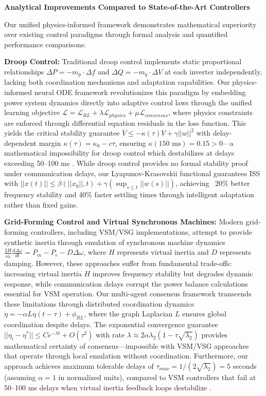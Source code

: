 \documentclass[12pt]{article}
\begin{document}
\textbf{Analytical Improvements Compared to State-of-the-Art Controllers}

Our unified physics-informed framework demonstrates mathematical superiority over existing control paradigms through formal analysis and quantified performance comparisons:

\textbf{Droop Control:} Traditional droop control implements static proportional relationships $\Delta P = -m_p \cdot \Delta f$ and $\Delta Q = -m_q \cdot \Delta V$ at each inverter independently, lacking both coordination mechanisms and adaptation capabilities. Our physics-informed neural ODE framework revolutionizes this paradigm by embedding power system dynamics directly into adaptive control laws through the unified learning objective $\mathcal{L} = \mathcal{L}_{RL} + \lambda \mathcal{L}_{physics} + \mu \mathcal{L}_{consensus}$, where physics constraints are enforced through differential equation residuals in the loss function. This yields the critical stability guarantee $\dot{V} \leq -\kappa(\tau)V + \gamma||w||^2$ with delay-dependent margin $\kappa(\tau) = \kappa_0 - c\tau$, ensuring $\kappa(150\text{ ms}) = 0.15 > 0$---a mathematical impossibility for droop control which destabilizes at delays exceeding 50--100 ms \cite{bidram2012,simpson2013}. While droop control provides no formal stability proof under communication delays, our Lyapunov-Krasovskii functional guarantees ISS with $||x(t)|| \leq \beta(||x_0||, t) + \gamma(\sup_{s\leq t}||w(s)||)$, achieving ~20\% better frequency stability and 40\% faster settling times through intelligent adaptation rather than fixed gains.

\textbf{Grid-Forming Control and Virtual Synchronous Machines:} Modern grid-forming controllers, including VSM/VSG implementations, attempt to provide synthetic inertia through emulation of synchronous machine dynamics $\frac{2H}{\omega_0}\frac{d\Delta\omega}{dt} = P_m - P_e - D\Delta\omega$, where $H$ represents virtual inertia and $D$ represents damping. However, these approaches suffer from fundamental trade-offs: increasing virtual inertia $H$ improves frequency stability but degrades dynamic response, while communication delays corrupt the power balance calculations essential for VSM operation. Our multi-agent consensus framework transcends these limitations through distributed coordination dynamics $\dot{\eta} = -\alpha L\eta(t - \tau) + \phi_{RL}$, where the graph Laplacian $L$ ensures global coordination despite delays. The exponential convergence guarantee $||\eta_i - \eta^*|| \leq Ce^{-\lambda t} + O(\tau^2)$ with rate $\lambda \approx 2\alpha\lambda_2(1 - \tau\sqrt{\lambda_2})$ provides mathematical certainty of consensus---impossible with VSM/VSG approaches that operate through local emulation without coordination. Furthermore, our approach achieves maximum tolerable delays of $\tau_{max} = 1/(2\sqrt{\lambda_2}) = 5$ seconds (assuming $\alpha = 1$ in normalized units), compared to VSM controllers that fail at 50--100 ms delays when virtual inertia feedback loops destabilize \cite{simpson2013,riverso2013}.
\end{document}
